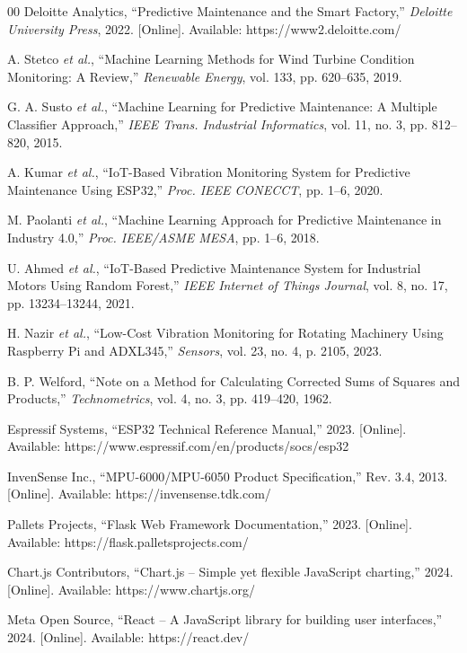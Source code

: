 \documentclass[conference]{IEEEtran}
\begin{document}
\begin{thebibliography}{00}
 Deloitte Analytics, ``Predictive Maintenance and the Smart Factory,'' \textit{Deloitte University Press}, 2022. [Online]. Available: https://www2.deloitte.com/

 A. Stetco \textit{et al.}, ``Machine Learning Methods for Wind Turbine Condition Monitoring: A Review,'' \textit{Renewable Energy}, vol. 133, pp. 620--635, 2019.

 G. A. Susto \textit{et al.}, ``Machine Learning for Predictive Maintenance: A Multiple Classifier Approach,'' \textit{IEEE Trans. Industrial Informatics}, vol. 11, no. 3, pp. 812--820, 2015.

 A. Kumar \textit{et al.}, ``IoT-Based Vibration Monitoring System for Predictive Maintenance Using ESP32,'' \textit{Proc. IEEE CONECCT}, pp. 1--6, 2020.

 M. Paolanti \textit{et al.}, ``Machine Learning Approach for Predictive Maintenance in Industry 4.0,'' \textit{Proc. IEEE/ASME MESA}, pp. 1--6, 2018.

 U. Ahmed \textit{et al.}, ``IoT-Based Predictive Maintenance System for Industrial Motors Using Random Forest,'' \textit{IEEE Internet of Things Journal}, vol. 8, no. 17, pp. 13234--13244, 2021.

 H. Nazir \textit{et al.}, ``Low-Cost Vibration Monitoring for Rotating Machinery Using Raspberry Pi and ADXL345,'' \textit{Sensors}, vol. 23, no. 4, p. 2105, 2023.

 B. P. Welford, ``Note on a Method for Calculating Corrected Sums of Squares and Products,'' \textit{Technometrics}, vol. 4, no. 3, pp. 419--420, 1962.

 Espressif Systems, ``ESP32 Technical Reference Manual,'' 2023. [Online]. Available: https://www.espressif.com/en/products/socs/esp32

 InvenSense Inc., ``MPU-6000/MPU-6050 Product Specification,'' Rev. 3.4, 2013. [Online]. Available: https://invensense.tdk.com/

 Pallets Projects, ``Flask Web Framework Documentation,'' 2023. [Online]. Available: https://flask.palletsprojects.com/

 Chart.js Contributors, ``Chart.js -- Simple yet flexible JavaScript charting,'' 2024. [Online]. Available: https://www.chartjs.org/

 Meta Open Source, ``React -- A JavaScript library for building user interfaces,'' 2024. [Online]. Available: https://react.dev/

\end{thebibliography}
\end{document}
